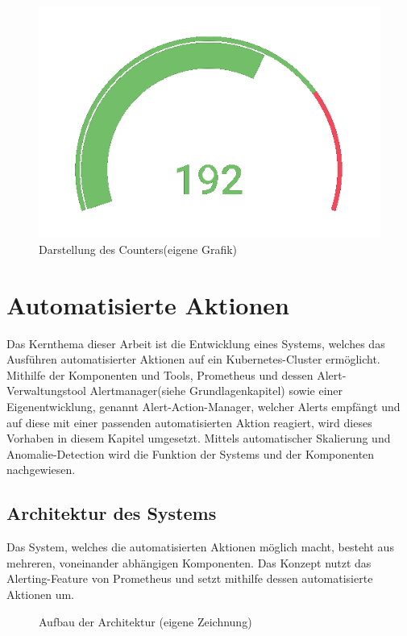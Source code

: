 \documentclass[a4paper,10pt]{scrartcl}
\begin{document}
\begin{figure}[htbp]
\includegraphics[scale=.8]{img/PercantageTransparent.png}
\caption{Darstellung des Counters(eigene Grafik)}
\end{figure}


\section{Automatisierte Aktionen}

Das Kernthema dieser Arbeit ist die Entwicklung eines Systems, welches das Ausführen automatisierter Aktionen auf ein Kubernetes-Cluster ermöglicht. Mithilfe der Komponenten und Tools, Prometheus und dessen Alert-Verwaltungstool \glqq Alertmanager\grqq (siehe Grundlagenkapitel) sowie einer Eigenentwicklung, genannt \glqq Alert-Action-Manager\grqq, welcher Alerts empfängt und auf diese mit einer passenden automatisierten Aktion reagiert, wird dieses Vorhaben in diesem Kapitel umgesetzt. Mittels automatischer Skalierung und Anomalie-Detection wird die Funktion der Systems und der Komponenten nachgewiesen.


\pagebreak
\subsection{Architektur des Systems}

Das System, welches die automatisierten Aktionen möglich macht, besteht aus mehreren, voneinander abhängigen Komponenten. Das Konzept nutzt das Alerting-Feature von Prometheus und setzt mithilfe dessen automatisierte Aktionen um.\\

\begin{figure}[htbp]
  \centering
  \scalebox{.6}{}
  \caption{Aufbau der Architektur (eigene Zeichnung)}
\end{figure}
\end{document}
